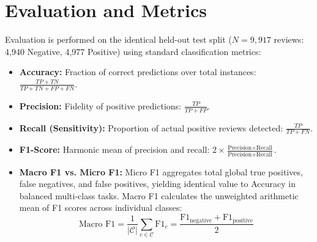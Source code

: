 \documentclass[12pt,a4paper]{report}
\begin{document}
\section{Evaluation and Metrics}
Evaluation is performed on the identical held-out test split ($N = 9,917$ reviews: 4,940 Negative, 4,977 Positive) using standard classification metrics:
\begin{itemize}
    \item \textbf{Accuracy:} Fraction of correct predictions over total instances: $\frac{TP + TN}{TP + TN + FP + FN}$.
    \item \textbf{Precision:} Fidelity of positive predictions: $\frac{TP}{TP + FP}$.
    \item \textbf{Recall (Sensitivity):} Proportion of actual positive reviews detected: $\frac{TP}{TP + FN}$.
    \item \textbf{F1-Score:} Harmonic mean of precision and recall: $2 \times \frac{\text{Precision} \times \text{Recall}}{\text{Precision} + \text{Recall}}$.
    \item \textbf{Macro F1 vs. Micro F1:} Micro F1 aggregates total global true positives, false negatives, and false positives, yielding identical value to Accuracy in balanced multi-class tasks. Macro F1 calculates the unweighted arithmetic mean of F1 scores across individual classes:
    \begin{equation}
        \text{Macro F1} = \frac{1}{|\mathcal{C}|} \sum_{c \in \mathcal{C}} \text{F1}_c = \frac{\text{F1}_{\text{negative}} + \text{F1}_{\text{positive}}}{2}
    \end{equation}
\end{itemize}
\end{document}
